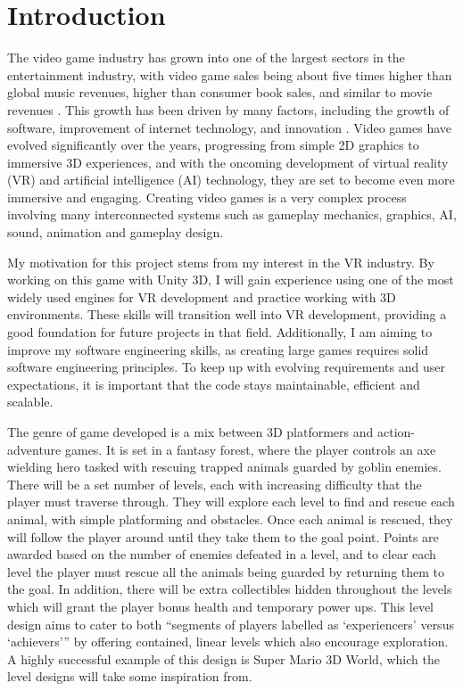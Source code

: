 \documentclass[10pt]{final_report}
\begin{document}
\chapter{Introduction}
The video game industry has grown into one of the largest sectors in the entertainment industry, with video game sales being about five times higher than global music revenues, higher than consumer book sales, and similar to movie revenues \cite{marchand2013value}. This growth has been driven by many factors, including the growth of software, improvement of internet technology, and innovation \cite{zackariasson2012video} . Video games have evolved significantly over the years, progressing from simple 2D graphics to immersive 3D experiences, and with the oncoming development of virtual reality (VR) and artificial intelligence (AI) technology, they are set to become even more immersive and engaging. Creating video games is a very complex process involving many interconnected systems such as gameplay mechanics, graphics, AI, sound, animation and gameplay design. \newline

My motivation for this project stems from my interest in the VR industry. By working on this game with Unity 3D, I will gain experience using one of the most widely used engines for VR development and practice working with 3D environments. These skills will transition well into VR development, providing a good foundation for future projects in that field. Additionally, I am aiming to improve my software engineering skills, as creating large games requires solid software engineering principles. To keep up with evolving requirements and user expectations, it is important that the code stays maintainable, efficient and scalable.\newline

The genre of game developed is a mix between 3D platformers and action-adventure games. It is set in a fantasy forest, where the player controls an axe wielding hero tasked with rescuing trapped animals guarded by goblin enemies. There will be a set number of levels, each with increasing difficulty that the player must traverse through. They will explore each level to find and rescue each animal, with simple platforming and obstacles. Once each animal is rescued, they will follow the player around until they take them to the goal point. Points are awarded based on the number of enemies defeated in a level, and to clear each level the player must rescue all the animals being guarded by returning them to the goal. In addition, there will be extra collectibles hidden throughout the levels which will grant the player bonus health and temporary power ups. This level design aims to cater to both ``segments of players labelled as `experiencers' versus `achievers''' \cite{zhao2022dynamic} by offering contained, linear levels which also encourage exploration. A highly successful example of this design is Super Mario 3D World, which the level designs will take some inspiration from.\newline
\end{document}
